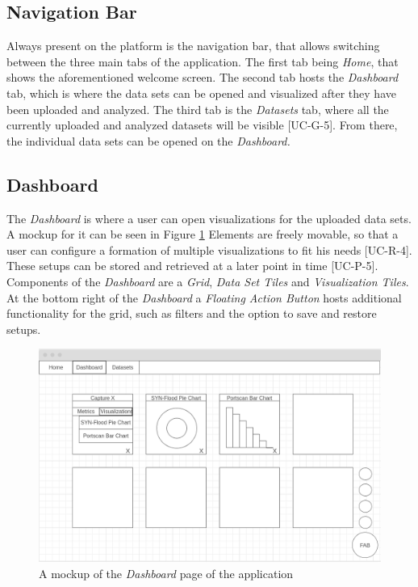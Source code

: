 \subsection{Navigation Bar}
Always present on the platform is the navigation bar, that allows switching between the three main tabs of the application. The first tab being \emph{Home}, that shows the aforementioned welcome screen. The second tab hosts the \emph{Dashboard} tab, which is where the data sets can be opened and visualized after they have been uploaded and analyzed. The third tab is the \emph{Datasets} tab, where all the currently uploaded and analyzed datasets will be visible [UC-G-5]. From there, the individual data sets can be opened on the \emph{Dashboard.}

\subsection{Dashboard}
The \emph{Dashboard} is where a user can open visualizations for the uploaded data sets. A mockup for it can be seen in Figure \ref{fig:dashboardmockup}  Elements are freely movable, so that a user can configure a formation of multiple visualizations to fit his needs [UC-R-4]. These setups can be stored and retrieved at a later point in time [UC-P-5]. Components of the \emph{Dashboard} are a \emph{Grid}, \emph{Data Set Tiles} and \emph{Visualization Tiles}. At the bottom right of the \emph{Dashboard} a \emph{Floating Action Button} hosts additional functionality for the grid, such as filters and the option to save and restore setups.

\begin{figure}
    \centering
    \includegraphics[width=16cm]{images/dashboard_mockup.png}
    \caption{A mockup of the \emph{Dashboard} page of the application}
    \label{fig:dashboardmockup}
\end{figure}

